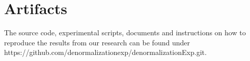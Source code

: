 \documentclass[sigconf]{acmart}
\begin{document}
\section*{Artifacts}

The source code, experimental scripts, documents and instructions on how to reproduce the results from our research can be found under https://github.com/denormalizationexp/denormalizationExp.git.



































\appendix

\end{document}
